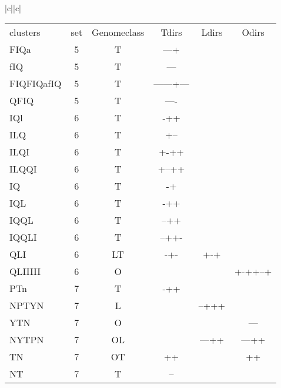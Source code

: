 \documentclass[table,
12pt, %
a4paper, %
oneside, %
headinclude,footinclude, %
BCOR5mm, %
]{scrartcl}
\begin{document}
\begin{table}[htbp]
\begin{adjustbox}{width=\textwidth,center}
\begin{tabular}{|c||c|}
      \begin{tabular}{l ccccc}
        clusters   & set & Genomeclass & Tdirs      & Ldirs & Odirs   \\
        \rowcolor{shadecolor}
        FIQa       & 5   & T           & ---+       &       &         \\
        fIQ        & 5   & T           & ---        &       &         \\
        FIQFIQafIQ & 5   & T           & ------+--- &       &         \\
        \rowcolor{white}
        QFIQ       & 5   & T           & ----       &       &         \\
        \rowcolor{shadecolor}
        IQl        & 6   & T           & -++        &       &         \\
        \rowcolor{white}
        ILQ        & 6   & T           & +--        &       &         \\
        ILQI       & 6   & T           & +-++       &       &         \\
        ILQQI      & 6   & T           & +--++      &       &         \\
        IQ         & 6   & T           & -+         &       &         \\
        IQL        & 6   & T           & -++        &       &         \\
        IQQL       & 6   & T           & --++       &       &         \\
        IQQLI      & 6   & T           & --++-      &       &         \\
        QLI        & 6   & LT          & -+-        & +-+   &         \\
        QLIIIII    & 6   & O           &            &       & +-++--+ \\
        \rowcolor{shadecolor}
        PTn        & 7   & T           & -++        &       &         \\
        \rowcolor{white}
        NPTYN      & 7   & L           &            & --+++ &         \\
        YTN        & 7   & O           &            &       & ---     \\
        NYTPN      & 7   & OL          &            & ---++ & ---++   \\
        TN         & 7   & OT          & ++         &       & ++      \\
        NT         & 7   & T           & --         &       &         \\

\end{tabular}
\end{tabular}
\end{adjustbox}
\end{table}
\end{document}
